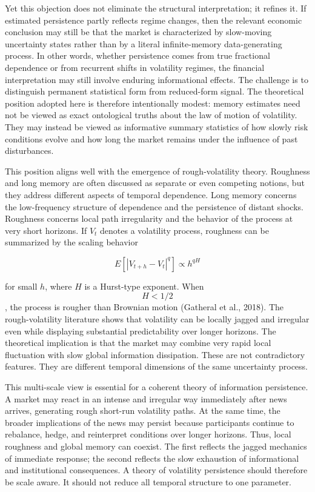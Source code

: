 \documentclass[12pt]{article}
\begin{document}
Yet this objection does not eliminate the structural interpretation; it refines it. If estimated persistence partly reflects regime changes, then the relevant economic conclusion may still be that the market is characterized by slow-moving uncertainty states rather than by a literal infinite-memory data-generating process. In other words, whether persistence comes from true fractional dependence or from recurrent shifts in volatility regimes, the financial interpretation may still involve enduring informational effects. The challenge is to distinguish permanent statistical form from reduced-form signal. The theoretical position adopted here is therefore intentionally modest: memory estimates need not be viewed as exact ontological truths about the law of motion of volatility. They may instead be viewed as informative summary statistics of how slowly risk conditions evolve and how long the market remains under the influence of past disturbances.

This position aligns well with the emergence of rough-volatility theory. Roughness and long memory are often discussed as separate or even competing notions, but they address different aspects of temporal dependence. Long memory concerns the low-frequency structure of dependence and the persistence of distant shocks. Roughness concerns local path irregularity and the behavior of the process at very short horizons. If $V_t$ denotes a volatility process, roughness can be summarized by the scaling behavior

\[E[|V_{t+h}-V_t|^q] \propto h^{qH}\]

for small $h$, where $H$ is a Hurst-type exponent. When $$H<1/2$$, the process is rougher than Brownian motion (Gatheral et al., 2018). The rough-volatility literature shows that volatility can be locally jagged and irregular even while displaying substantial predictability over longer horizons. The theoretical implication is that the market may combine very rapid local fluctuation with slow global information dissipation. These are not contradictory features. They are different temporal dimensions of the same uncertainty process.

This multi-scale view is essential for a coherent theory of information persistence. A market may react in an intense and irregular way immediately after news arrives, generating rough short-run volatility paths. At the same time, the broader implications of the news may persist because participants continue to rebalance, hedge, and reinterpret conditions over longer horizons. Thus, local roughness and global memory can coexist. The first reflects the jagged mechanics of immediate response; the second reflects the slow exhaustion of informational and institutional consequences. A theory of volatility persistence should therefore be scale aware. It should not reduce all temporal structure to one parameter.
\end{document}
